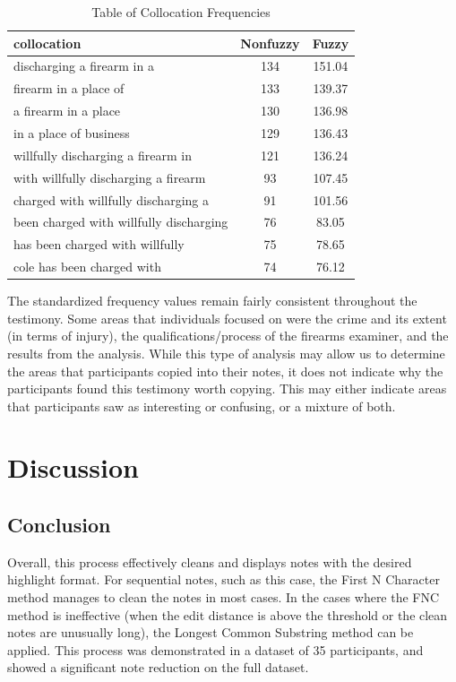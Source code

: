 \documentclass[print]{nuthesis}
\begin{document}
\begin{table}

\caption{\label{tab:nonfuzzycount}Table of Collocation Frequencies}
\centering
\begin{tabular}[t]{l|c|c}
\hline
collocation & Nonfuzzy & Fuzzy\\
\hline
discharging a firearm in a & 134 & 151.04\\
\hline
firearm in a place of & 133 & 139.37\\
\hline
a firearm in a place & 130 & 136.98\\
\hline
in a place of business & 129 & 136.43\\
\hline
willfully discharging a firearm in & 121 & 136.24\\
\hline
with willfully discharging a firearm & 93 & 107.45\\
\hline
charged with willfully discharging a & 91 & 101.56\\
\hline
been charged with willfully discharging & 76 & 83.05\\
\hline
has been charged with willfully & 75 & 78.65\\
\hline
cole has been charged with & 74 & 76.12\\
\hline
\end{tabular}
\end{table}

The standardized frequency values remain fairly consistent throughout the testimony.
Some areas that individuals focused on were the crime and its extent (in terms of injury), the qualifications/process of the firearms examiner, and the results from the analysis.
While this type of analysis may allow us to determine the areas that participants copied into their notes, it does not indicate why the participants found this testimony worth copying.
This may either indicate areas that participants saw as interesting or confusing, or a mixture of both.

\hypertarget{discussion-1}{%
\section{Discussion}\label{discussion-1}}

\hypertarget{conclusion-1}{%
\subsection{Conclusion}\label{conclusion-1}}

Overall, this process effectively cleans and displays notes with the desired highlight format.
For sequential notes, such as this case, the First N Character method manages to clean the notes in most cases.
In the cases where the FNC method is ineffective (when the edit distance is above the threshold or the clean notes are unusually long), the Longest Common Substring method can be applied.
This process was demonstrated in a dataset of 35 participants, and showed a significant note reduction on the full dataset.
\end{document}
